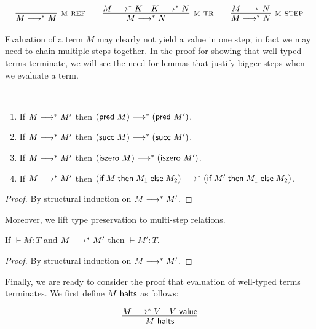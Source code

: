 \[
\begin{array}{c@{\qquad}c@{\qquad}c}
\infer[\MRef]{M \MSteps M}{} &
\infer[\MTr]{M \MSteps N}{M \MSteps K & K \MSteps N} &
\infer[\MStep]{M \MSteps N}{M \Steps N}
\end{array}
\]

Evaluation of a term $M$ may clearly not yield a value in one step; in fact we may need to chain multiple steps together.
In the proof for showing that well-typed terms terminate, we will see the need for lemmas that justify bigger steps when we evaluate a term.

\begin{lemma}~
  \begin{enumerate}
  \item If $M \longrightarrow^* M'$ then $(\textsf{pred}~M) \longrightarrow^* (\textsf{pred}~M')$.
  \item If $M \longrightarrow^* M'$ then $(\textsf{succ}~M) \longrightarrow^* (\textsf{succ}~M')$.
  \item If $M \longrightarrow^* M'$ then $(\textsf{iszero}~M) \longrightarrow^* (\textsf{iszero}~M')$.
  \item If $M \longrightarrow^* M'$ then $(\textsf{if\;} M \textsf{\;then\;} M_1 \textsf{\;else\;} M_2) \longrightarrow^* (\textsf{if\;} M' \textsf{\;then\;} M_1 \textsf{\;else\;} M_2)$.
  \end{enumerate}
\end{lemma}
\begin{proof}
By structural induction  on $M \longrightarrow^* M'$.
\end{proof}

Moreover, we lift type preservation to multi-step relations.

\begin{lemma}
If $\vdash M : T$ and $M \longrightarrow^* M'$ then $\vdash M':T$.
\end{lemma}
\begin{proof}
By structural induction on $M \longrightarrow^* M'$.
\end{proof}

Finally, we are ready to consider the proof that evaluation of well-typed terms
terminates. We first define $M ~\mathsf{halts}$ as follows:

\[
\begin{array}{c}
\infer{M \Halts}{M \MSteps V & V \Value }
\end{array}
\]



